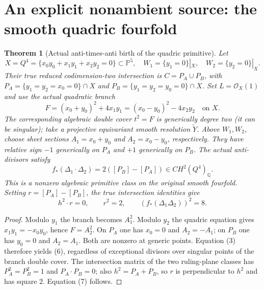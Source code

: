 \documentclass[11pt]{article}
\newtheorem{theorem}{Theorem}
\begin{document}
\section{An explicit nonambient source: the smooth quadric fourfold}
\begin{theorem}[Actual anti-times-anti birth of the quadric primitive]
Let
\[
 X=Q^4=\{x_0y_0+x_1y_1+x_2y_2=0\}\subset\mathbb P^5,
 \quad W_1=\{y_1=0\}|_X,\quad W_2=\{y_2=0\}|_X.
\]
Their true reduced codimension-two intersection is
$C=P_A\cup P_B$, with
$P_A=\{y_1=y_2=x_0=0\}\cap X$ and
$P_B=\{y_1=y_2=y_0=0\}\cap X$.
Set $L=\mathcal O_X(1)$ and use the actual quadratic branch
\[
 \boxed{
 F=(x_0+y_0)^2+4x_1y_1
   =(x_0-y_0)^2-4x_2y_2\quad\text{on }X.
 } \tag{5}
\]
The corresponding algebraic double cover $t^2=F$ is
generically degree two (it can be singular); take a
projective equivariant smooth resolution $\widetilde Y$.
Above $W_1,W_2$, choose sheet sections
$A_1=x_0+y_0$ and $A_2=x_0-y_0$, respectively.
They have relative sign $-1$ generically on $P_A$ and
$+1$ generically on $P_B$. The actual anti-divisors satisfy
\[
 \boxed{
  f_*(\Delta_1\cdot\Delta_2)
       =2([P_B]-[P_A])\in CH^2(Q^4)_{\mathbb Q}.
 } \tag{6}
\]
This is a nonzero algebraic primitive class on the
\emph{original} smooth fourfold. Setting
$r=[P_A]-[P_B]$, the true intersection identities give
\[
 \boxed{h^2\cdot r=0,\qquad r^2=2,\qquad
 (f_*(\Delta_1\Delta_2))^2=8.}                 \tag{7}
\]
\end{theorem}
\begin{proof}
Modulo $y_1$ the branch becomes $A_1^2$.
Modulo $y_2$ the quadric equation gives
$x_1y_1=-x_0y_0$, hence $F=A_2^2$.
On $P_A$ one has $x_0=0$ and $A_2=-A_1$;
on $P_B$ one has $y_0=0$ and $A_2=A_1$.
Both are nonzero at generic points. Equation (3)
therefore yields (6), regardless of exceptional divisors
over singular points of the branch double cover.
The intersection matrix of the two ruling-plane classes
has $P_A^2=P_B^2=1$ and $P_A\cdot P_B=0$;
also $h^2=P_A+P_B$, so $r$ is perpendicular to $h^2$
and has square $2$. Equation (7) follows.
\end{proof}
\end{document}
